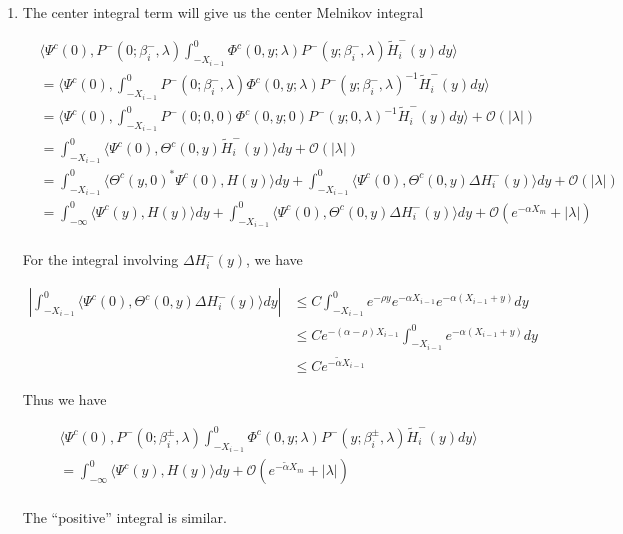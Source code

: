 \documentclass[12pt]{article}
\begin{document}
\begin{enumerate}
\item The center integral term will give us the center Melnikov integral

\begin{align*}
&\langle \Psi^c(0), P^-(0; \beta_i^-, \lambda) \int_{-X_{i-1}}^0 \Phi^c(0, y; \lambda) P^-(y; \beta_i^-, \lambda) \tilde{H}_i^-(y) dy \rangle \\
&= \langle \Psi^c(0), \int_{-X_{i-1}}^0 P^-(0; \beta_i^-, \lambda) \Phi^c(0, y; \lambda) P^-(y; \beta_i^-, \lambda)^{-1} \tilde{H}_i^-(y) dy \rangle \\
&= \langle \Psi^c(0), \int_{-X_{i-1}}^0 P^-(0; 0, 0) \Phi^c(0, y; 0) P^-(y; 0, \lambda)^{-1} \tilde{H}_i^-(y) dy \rangle + \mathcal{O}(|\lambda|) \\
&= \int_{-X_{i-1}}^0 \langle \Psi^c(0), \Theta^c(0, y) \tilde{H}_i^-(y) \rangle dy + \mathcal{O}(|\lambda|) \\
&= \int_{-X_{i-1}}^0 \langle \Theta^c(y, 0)^* \Psi^c(0), H(y) \rangle dy + \int_{-X_{i-1}}^0 \langle \Psi^c(0), \Theta^c(0, y) \Delta H_i^-(y) \rangle dy + \mathcal{O}(|\lambda|) \\
&= \int_{-\infty}^0 \langle \Psi^c(y), H(y) \rangle dy + \int_{-X_{i-1}}^0 \langle \Psi^c(0), \Theta^c(0, y) \Delta H_i^-(y) \rangle dy + \mathcal{O}(e^{-\alpha X_m} + |\lambda|) \\
\end{align*}

For the integral involving $\Delta H_i^-(y)$, we have

\begin{align*}
\left| \int_{-X_{i-1}}^0 \langle \Psi^c(0), \Theta^c(0, y) \Delta H_i^-(y) \rangle dy \right| &\leq C \int_{-X_{i-1}}^0 e^{-\rho y} e^{-\alpha X_{i-1}} e^{-\alpha(X_{i-1} + y)} dy \\
&\leq C e^{-(\alpha - \rho)X_{i-1}} \int_{-X_{i-1}}^0 e^{-\alpha(X_{i-1} + y)} dy \\
&\leq C e^{-\tilde{\alpha}X_{i-1}}
\end{align*}

Thus we have

\begin{align*}
&\langle \Psi^c(0), P^-(0; \beta_i^\pm, \lambda) \int_{-X_{i-1}}^0 \Phi^c(0, y; \lambda) P^-(y; \beta_i^\pm, \lambda) \tilde{H}_i^-(y) dy \rangle \\
&= \int_{-\infty}^0 \langle \Psi^c(y), H(y) \rangle dy + \mathcal{O}(e^{-\tilde{\alpha} X_m} + |\lambda|) \\
\end{align*}

The ``positive'' integral is similar.

\end{enumerate}
\end{document}
